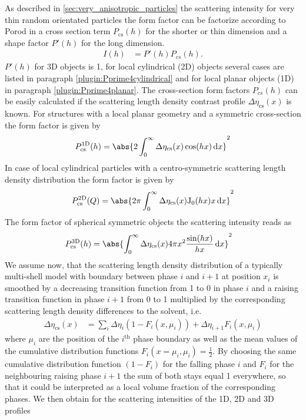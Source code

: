 As described in \ref{sec:very_anisotropic_particles} the scattering intensity for very thin random orientated particles the form factor can be factorize according to Porod \cite{Porod1948} in a cross section term $P_\text{cs}(h)$ for the shorter or thin dimension and a shape factor $P'(h)$ for the long dimension.
\begin{align}
\label{eq:PprimePcs}
I(h) &=P'(h) P_{cs}(h).
\end{align}
$P'(h)$ for 3D objects is 1, for local cylindrical (2D) objects several cases are listed in paragraph \ref{plugin:Pprime4cylindrical} and for local planar objects (1D) in paragraph \ref{plugin:Pprime4planar}.
The cross-section form factors $P_{cs}(h)$ can be easily calculated if the
scattering length density contrast profile
$\Delta\eta_\textrm{cs}(x)$ is known. For structures with a local
planar geometry and a symmetric cross-section the form factor is
given by
\begin{align}
P_\textrm{cs}^\textrm{1D} (h) = \abs{2\int_0^\infty
\Delta\eta_\textrm{cs}(x) \cos(hx) \, \textrm{d}x}^2
\label{Pcs:1D}
\end{align}
In case of local cylindrical particles with a centro-symmetric
scattering length density distribution the form factor is given by
\begin{align}
P_\textrm{cs}^\textrm{2D} (Q) = \abs{2\pi\int_0^\infty
\Delta\eta_\textrm{cs}(x) \textrm{J}_0(hx)x \,
\textrm{d}x}^2 \label{Pcs:2D}
\end{align}
The form factor of spherical symmetric objects the scattering intensity reads as
\begin{align}
  P_\textrm{cs}^\mathrm{3D}(h) & = \abs{ \int_0^\infty \Delta\eta_\textrm{cs}(x)4\pi x^2 \frac{\sin (hx)}{hx}\,\mathrm{d}x }^2
\label{Pcs:3D}
\end{align}
We assume now, that the scattering length density distribution of a typically multi-shell model with boundary between phase $i$ and $i+1$ at position $x_i$ is smoothed by a decreasing transition function from 1 to 0 in phase $i$ and a raising transition function in phase $i+1$ from 0 to 1 multiplied by the corresponding scattering  length density differences to the solvent, i.e.
\begin{align}\label{eq:smoothedDetaCS}
  \Delta\eta_\textrm{cs}(x) &= \sum_i \Delta\eta_i (1-F_i(x,\mu_i)) + \Delta\eta_{i+1} F_i(x,\mu_i)
\end{align}
where $\mu_i$ are the position of the $i^\mathrm{th}$ phase boundary as well as the mean values of the cumulative distribution functions $F_i(x=\mu_i,\mu_i)=\frac12$. By choosing the same cumulative distribution function $(1-F_i)$ for the falling phase $i$ and $F_i$ for the neighbouring raising phase $i+1$ the sum of both stays equal 1 everywhere, so that it could be interpreted as a local volume fraction of the corresponding phases. We then obtain for the scattering intensities of the 1D, 2D and 3D profiles
